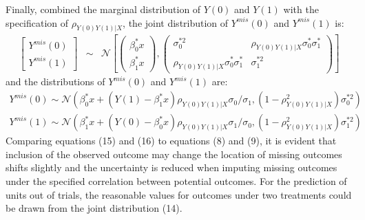 	Finally, combined the marginal distribution of $Y(0)$ and $Y(1)$ with the specification of $\rho_{Y(0)Y(1)|X}$, the joint distribution of $Y^{mis}(0)$ and $Y^{mis}(1)$ is:
	\begin{eqnarray}
		\left[\begin{array}{c}
			Y^{mis}(0)\\
			Y^{mis}(1)
		\end{array}\right] & \sim & \mathcal{N}\left[\left(\begin{array}{c}
			\beta^{*}_{0}x\\
			\beta^{*}_{1}x
		\end{array}\right),\left(\begin{array}{cc}
			\sigma^{*2}_{0} & \rho_{Y(0)Y(1)|X}\sigma^{*}_{0}\sigma^{*}_{1}\\
			\rho_{Y(0)Y(1)|X}\sigma^{*}_{0}\sigma^{*}_{1} & \sigma^{*2}_{1} 
		\end{array}\right)\right]
	\end{eqnarray}
	and the distributions of $Y^{mis}(0)$ and $Y^{mis}(1)$ are:
	\begin{align}
		Y^{mis}(0) \sim \mathcal{N} (\beta^{*}_{0}x + (Y(1) - \beta^{*}_{1}x)\rho_{Y(0)Y(1)|X}\sigma_{0} / \sigma_{1}, (1 - \rho_{Y(0)Y(1)|X}^2)\sigma^{*2}_{0})\\
		Y^{mis}(1) \sim \mathcal{N} (\beta^{*}_{1}x + (Y(0) - \beta^{*}_{0}x)\rho_{Y(0)Y(1)|X}\sigma_{1} / \sigma_{0}, (1 - \rho_{Y(0)Y(1)|X}^2)\sigma^{*2}_{1})
	\end{align}
	Comparing equations (15) and (16) to equations (8) and (9), it is evident that inclusion of the observed outcome may change the location of missing outcomes shifts slightly and the uncertainty is reduced when imputing missing outcomes under the specified correlation between potential outcomes. For the prediction of units out of trials, the reasonable values for outcomes under two treatments could be drawn from the joint distribution (14). 
	
